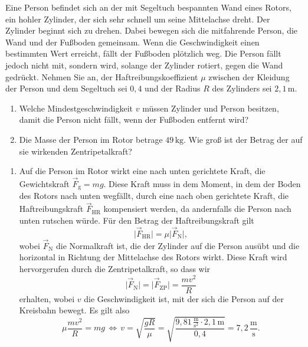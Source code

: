 \begin{MExercises}
  \begin{MExercise}
   Eine Person befindet sich an der mit Segeltuch bespannten Wand eines Rotors, ein hohler Zylinder, der sich sehr schnell um seine Mittelachse dreht. Der Zylinder beginnt sich zu drehen. Dabei bewegen sich die mitfahrende Person, die Wand und der Fu{\ss}boden gemeinsam. Wenn die Geschwindigkeit einen bestimmten Wert erreicht, f\"allt der Fu{\ss}boden pl\"otzlich weg. Die Person f\"allt jedoch nicht mit, sondern wird, solange der Zylinder rotiert, gegen die Wand gedr\"uckt. Nehmen Sie an, der Haftreibungskoeffizient $\mu$ zwischen der Kleidung der Person und dem Segeltuch sei $0{,}4$ und der Radius $R$ des Zylinders sei $2{,}1\,\text{m}$.
   \begin{enumerate}
   \item Welche Mindestgeschwindigkeit $v$ m\"ussen Zylinder und Person besitzen, damit die Person nicht f\"allt, wenn der Fu{\ss}boden entfernt wird?
   \item Die Masse der Person im Rotor betrage  $49\,\text{kg}$. Wie gro{\ss} ist der Betrag der auf sie wirkenden Zentripetalkraft?
   \end{enumerate}
   \begin{MSolution}
   \begin{enumerate}
   \item Auf die Person im Rotor wirkt eine nach unten gerichtete Kraft, die Gewichtskraft $\vec{F}_{\textrm{g}}=mg$. Diese Kraft muss in dem Moment, in dem der Boden des Rotors nach unten wegf\"allt, durch eine nach oben gerichtete Kraft, die Haftreibungskraft $\vec{F}_{\textrm{HR}}$ kompensiert werden, da andernfalls die Person nach unten rutschen w\"urde. F\"ur den Betrag der Haftreibungskraft gilt
   \begin{equation}
   \vert\vec{F}_{\textrm{HR}}\vert=\mu\vert\vec{F}_{\textrm{N}}\vert,
   \end{equation}wobei $\vec{F}_{\textrm{N}}$ die Normalkraft ist, die der Zylinder auf die Person aus\"ubt und die horizontal in Richtung der Mittelachse des Rotors wirkt. Diese Kraft wird hervorgerufen durch die Zentripetalkraft, so dass wir
   \begin{equation}
   \vert\vec{F}_{\textrm{N}}\vert=\vert\vec{F}_{\textrm{ZP}}\vert=\frac{mv^2}{R}
   \end{equation}erhalten, wobei $v$ die Geschwindigkeit ist, mit der sich die Person auf der Kreisbahn bewegt. Es gilt also
   \begin{equation}
   \mu \frac{mv^2}{R}=mg\,\Leftrightarrow\, v=\sqrt{\frac{gR}{\mu}}=\sqrt{\frac{9{,}81\,\frac{\text{m}}{\text{s}^2}\cdot 2{,}1\,\text{m}}{0{,}4}}=7{,}2\,\frac{\text{m}}{\text{s}}.

\end{equation}
\end{enumerate}
\end{MSolution}
\end{MExercise}
\end{MExercises}

